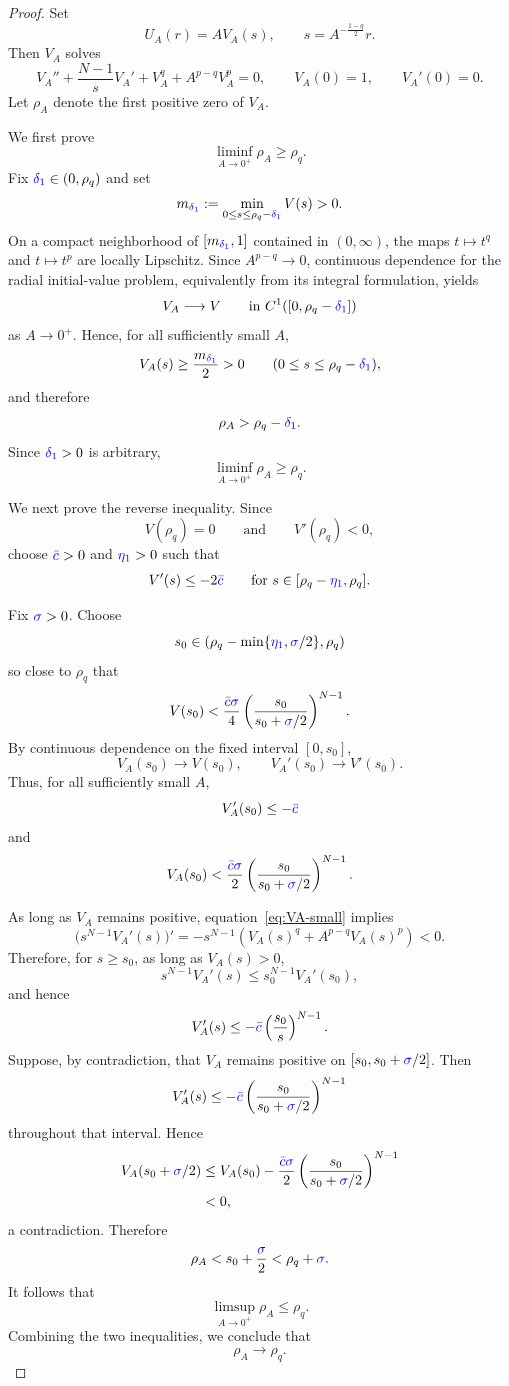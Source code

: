 \documentclass[11pt]{article}
\newcommand{\add}[1]{{\color{blue}#1}}
\newcommand{\oldrev}[1]{#1}
\theoremstyle{definition}
\begin{document}
\begin{proof}
Set
\[
U_A(r)
=
A V_A(s),
\qquad
s=A^{-\frac{1-q}{2}}r.
\]
Then $V_A$ solves
\begin{equation}
\label{eq:VA-small}
V_A''
+\frac{N-1}{s}V_A'
+V_A^q
+A^{p-q}V_A^p
=0,
\qquad
V_A(0)=1,
\qquad
V_A'(0)=0.
\end{equation}
Let $\rho_A$ denote the first positive zero of $V_A$.

\oldrev{We first prove
\[
\liminf_{A\to0^+}\rho_A\geq\rho_q.
\]}
Fix \oldrev{$\add{\delta_1}\in(0,\rho_q)$ and set
\[
m_{\add{\delta_1}}
:=
\min_{0\leq s\leq\rho_q-\add{\delta_1}}V(s)>0.
\]}
On a \oldrev{compact} neighborhood of
\oldrev{$[m_{\add{\delta_1}},1]$ contained in $(0,\infty)$}, the
\oldrev{maps $t\mapsto t^q$ and $t\mapsto t^p$} are locally
Lipschitz. \oldrev{Since $A^{p-q}\to0$, continuous dependence
for the radial initial-value problem, equivalently from its integral
formulation, yields}
\[
V_A\longrightarrow V
\qquad\text{in }C^1([0,\rho_q-\add{\delta_1}])
\]
as $A\to0^+$. \oldrev{Hence, for all sufficiently small $A$,
\[
V_A(s)\geq\frac{m_{\add{\delta_1}}}{2}>0
\qquad
(0\leq s\leq\rho_q-\add{\delta_1}),
\]
and therefore
\[
\rho_A>\rho_q-\add{\delta_1}.
\]
Since $\add{\delta_1}>0$ is arbitrary,}
\[
\liminf_{A\to0^+}\rho_A\geq\rho_q.
\]

We next prove the reverse inequality. \oldrev{Since}
\[
V(\rho_q)=0
\qquad\text{and}\qquad
V'(\rho_q)<0,
\]
\oldrev{choose $\add{\bar c}>0$ and $\add{\eta_1}>0$ such that
\[
V'(s)\leq-2\add{\bar c}
\qquad
\text{for }
s\in[\rho_q-\add{\eta_1},\rho_q].
\]}

Fix $\add{\sigma}>0$.
\oldrev{Choose}
\[
s_0\in
\oldrev{
\left(
\rho_q-\min\{\add{\eta_1},\add{\sigma}/2\},
\rho_q
\right)}
\]
so close to $\rho_q$ that
\[
\oldrev{
V(s_0)
<
\frac{\add{\bar c}\add{\sigma}}{4}
\left(
\frac{s_0}{s_0+\add{\sigma}/2}
\right)^{N-1}.}
\]
By continuous dependence
\oldrev{on the fixed interval $[0,s_0]$},
\[
V_A(s_0)\to V(s_0),
\qquad
V_A'(s_0)\to V'(s_0).
\]
\oldrev{Thus, for all sufficiently small $A$,}
\[
V_A'(s_0)\leq -\add{\bar c}
\]
\oldrev{and
\[
V_A(s_0)
<
\frac{\add{\bar c}\add{\sigma}}{2}
\left(
\frac{s_0}{s_0+\add{\sigma}/2}
\right)^{N-1}.
\]}

As long as $V_A$ remains positive, equation~\eqref{eq:VA-small}
implies
\[
\bigl(s^{N-1}V_A'(s)\bigr)'
=
-s^{N-1}
\left(
V_A(s)^q+A^{p-q}V_A(s)^p
\right)
<0.
\]
Therefore, for $s\geq s_0$, as long as $V_A(s)>0$,
\[
s^{N-1}V_A'(s)
\leq
s_0^{N-1}V_A'(s_0),
\]
and hence
\[
V_A'(s)
\leq
-\add{\bar c}\left(\frac{s_0}{s}\right)^{N-1}.
\]
\oldrev{Suppose, by contradiction, that $V_A$ remains positive
on $[s_0,s_0+\add{\sigma}/2]$. Then
\[
V_A'(s)
\leq
-\add{\bar c}
\left(
\frac{s_0}{s_0+\add{\sigma}/2}
\right)^{N-1}
\]
throughout that interval. Hence
\[
\begin{aligned}
V_A(s_0+\add{\sigma}/2)
&\leq
V_A(s_0)
-\frac{\add{\bar c}\add{\sigma}}{2}
\left(
\frac{s_0}{s_0+\add{\sigma}/2}
\right)^{N-1}\\
&<0,
\end{aligned}
\]
a contradiction. Therefore
\[
\rho_A<s_0+\frac{\add{\sigma}}{2}<\rho_q+\add{\sigma}.
\]}
It follows that
\[
\limsup_{A\to0^+}\rho_A\leq\rho_q.
\]
Combining the two inequalities, we conclude that
\[
\rho_A\longrightarrow\rho_q.
\]


\end{proof}
\end{document}
